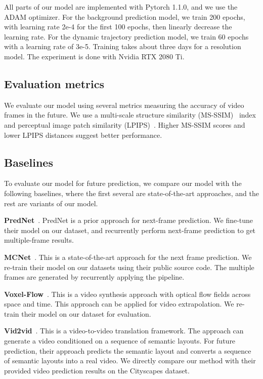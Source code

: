 \documentclass[10pt,twocolumn,letterpaper]{article}
\begin{document}
All parts of our model are implemented with Pytorch 1.1.0, and we use the ADAM optimizer. For the background prediction model, we train 200 epochs, with learning rate 2e-4 for the first 100 epochs, then linearly decrease the learning rate. For the dynamic trajectory prediction model, we train 60 epochs with a learning rate of 3e-5. Training takes about three days for a  resolution model. The experiment is done with Nvidia RTX 2080 Ti. 
 
\subsection{Evaluation metrics}
We evaluate our model using several metrics measuring the accuracy of video frames in the future. We use a multi-scale structure similarity (MS-SSIM)~\cite{msssim} index and perceptual image patch similarity (LPIPS)~\cite{lpips}. Higher MS-SSIM scores and lower LPIPS distances suggest better performance.


\subsection{Baselines}
To evaluate our model for future prediction, we compare our model with the following baselines, where the first several are state-of-the-art approaches, and the rest are variants of our model. 


\vspace{2mm}
\noindent \textbf{PredNet}~\cite{prednet}. PredNet is a prior approach for next-frame prediction. We fine-tune their model on our dataset, and recurrently perform next-frame prediction to get multiple-frame results.

\vspace{2mm}
\noindent \textbf{MCNet}~\cite{villegas17mcnet}. This is a state-of-the-art approach for the next frame prediction. We re-train their model on our datasets using their public source code. The multiple frames are generated by recurrently applying the pipeline.

\vspace{2mm}
\noindent \textbf{Voxel-Flow}~\cite{liu2017voxelflow}. This is a video synthesis approach with optical flow fields across space and time. This approach can be applied for video extrapolation. We re-train their model on our dataset for evaluation.

\vspace{2mm}
\noindent \textbf{Vid2vid}~\cite{Wang2018}. This is a video-to-video translation framework. The approach can generate a video conditioned on a sequence of semantic layouts. For future prediction, their approach predicts the semantic layout and converts a sequence of semantic layouts into a real video. We directly compare our method with their provided video prediction results on the Cityscapes dataset.
\end{document}

